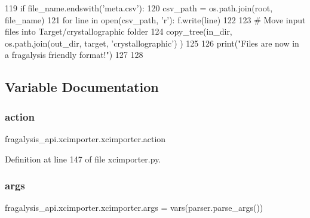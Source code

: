 \begin{DoxyCode}
119                     \textcolor{keywordflow}{if} file\_name.endswith(\textcolor{stringliteral}{'meta.csv'}):
120                         csv\_path = os.path.join(root, file\_name)
121                         \textcolor{keywordflow}{for} line \textcolor{keywordflow}{in} open(csv\_path, \textcolor{stringliteral}{'r'):                            f.write(line)}
122 \textcolor{stringliteral}{}
123 \textcolor{stringliteral}{    }\textcolor{comment}{# Move input files into Target/crystallographic folder}
124     copy\_tree(in\_dir, os.path.join(out\_dir, target, \textcolor{stringliteral}{'crystallographic'}) )
125 
126     print(\textcolor{stringliteral}{"Files are now in a fragalysis friendly format!"})
127 
128 \end{DoxyCode}


\subsection{Variable Documentation}
\mbox{\label{namespacefragalysis__api_1_1xcimporter_1_1xcimporter_a2f2ce1af5a866eee454177b072be63f8}} 
\subsubsection{\texorpdfstring{action}{action}}
{\footnotesize\ttfamily fragalysis\+\_\+api.\+xcimporter.\+xcimporter.\+action}



Definition at line 147 of file xcimporter.\+py.

\mbox{\label{namespacefragalysis__api_1_1xcimporter_1_1xcimporter_a3ad0db7b1c2c8a00d4963bf5f7dd21bc}} 
\subsubsection{\texorpdfstring{args}{args}}
{\footnotesize\ttfamily fragalysis\+\_\+api.\+xcimporter.\+xcimporter.\+args = vars(parser.\+parse\+\_\+args())}



